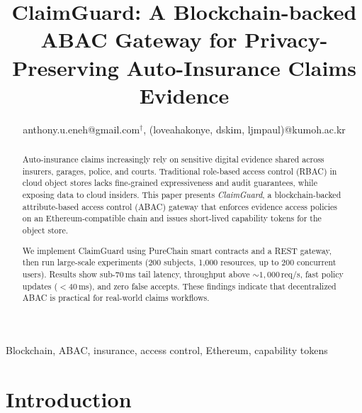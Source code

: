 \documentclass[conference]{IEEEtran}
\begin{document}
\title{ClaimGuard: A Blockchain-backed ABAC Gateway for Privacy-Preserving Auto-Insurance Claims Evidence}

\author{ 
{anthony.u.eneh@gmail.com$^{\dagger}$, (loveahakonye, dskim, ljmpaul)}@kumoh.ac.kr}
\maketitle

\begin{abstract}
Auto-insurance claims increasingly rely on sensitive digital evidence shared across insurers, garages, police, and courts. Traditional role-based access control (RBAC) in cloud object stores lacks fine-grained expressiveness and audit guarantees, while exposing data to cloud insiders. This paper presents \emph{ClaimGuard}, a blockchain-backed attribute-based access control (ABAC) gateway that enforces evidence access policies on an Ethereum-compatible chain and issues short-lived capability tokens for the object store.

We implement ClaimGuard using PureChain smart contracts and a REST gateway, then run large-scale experiments (200 subjects, 1{,}000 resources, up to 200 concurrent users). Results show sub-70\,ms tail latency, throughput above ${\sim}1{,}000$\,req/s, fast policy updates (${<}40$\,ms), and zero false accepts. These findings indicate that decentralized ABAC is practical for real-world claims workflows.
\end{abstract}

\begin{IEEEkeywords}
Blockchain, ABAC, insurance, access control, Ethereum, capability tokens
\end{IEEEkeywords}

\section{Introduction}
\end{document}
